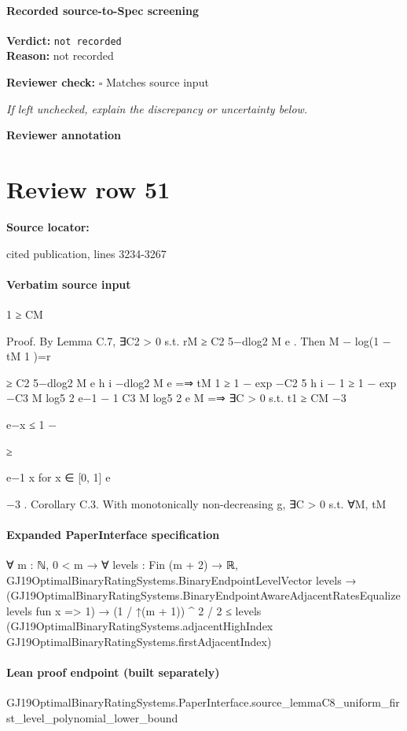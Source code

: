 \documentclass[10pt]{article}
\newcommand{\reviewerbox}{%
  \par\noindent\fbox{\parbox{0.96\linewidth}{\rule{0pt}{0.38in}}}\par
}
\newcommand{\reviewmatch}[1]{%
  \par\noindent\textbf{Reviewer check:} $\square$\; #1\par
  \noindent\emph{If left unchecked, explain the discrepancy or uncertainty below.}\par
}
\begin{document}
\paragraph{Recorded source-to-Spec screening}
\textbf{Verdict:} \texttt{not recorded}
\\
\textbf{Reason:} not recorded
\reviewmatch{Matches source input}
\noindent\textbf{Reviewer annotation}\par
\reviewerbox
\clearpage
\hypertarget{source-claim-905297a638ebd8e0}{}
\section*{Review row 51}
\textbf{Source locator:} {\footnotesize\raggedright cited publication, lines 3234-\allowbreak{}3267\par}
\paragraph{Verbatim source input}
\begin{ReviewVerbatim}
1 ≥ CM

Proof. By Lemma C.7, ∃C2 > 0 s.t. rM ≥ C2 5−dlog2 M e . Then
M
− log(1 − tM
1 )=r

≥ C2 5−dlog2 M e
h
i
−dlog2 M e
=⇒ tM
1 ≥ 1 − exp −C2 5
h
i
− 1
≥ 1 − exp −C3 M log5 2
e−1
− 1
C3 M log5 2
e
M
=⇒ ∃C > 0 s.t. t1 ≥ CM −3

e−x ≤ 1 −

≥

e−1
x for x ∈ [0, 1]
e

−3 .
Corollary C.3. With monotonically non-decreasing g, ∃C > 0 s.t. ∀M, tM
\end{ReviewVerbatim}


\paragraph{Expanded PaperInterface specification}
\begin{ReviewVerbatim}
∀ {m : ℕ},
  0 < m →
    ∀ {levels : Fin (m + 2) → ℝ},
      GJ19OptimalBinaryRatingSystems.BinaryEndpointLevelVector levels →
        (GJ19OptimalBinaryRatingSystems.BinaryEndpointAwareAdjacentRatesEqualize levels fun x => 1) →
          (1 / ↑(m + 1)) ^ 2 / 2 ≤
            levels (GJ19OptimalBinaryRatingSystems.adjacentHighIndex GJ19OptimalBinaryRatingSystems.firstAdjacentIndex)
\end{ReviewVerbatim}

\paragraph{Lean proof endpoint (built separately)}\begin{ReviewVerbatim}
GJ19OptimalBinaryRatingSystems.PaperInterface.source_lemmaC8_uniform_first_level_polynomial_lower_bound
\end{ReviewVerbatim}
\end{document}
